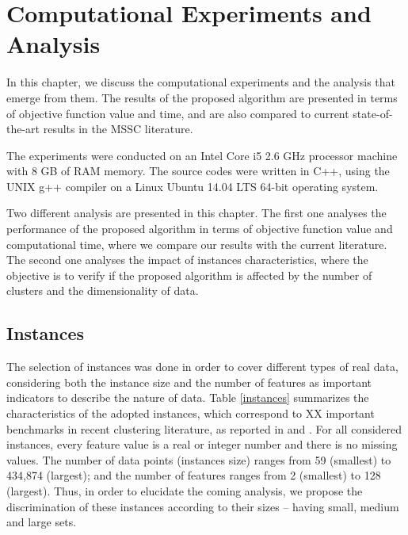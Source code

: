 \chapter{Computational Experiments and Analysis}
In this chapter, we discuss the computational experiments and the analysis that emerge from them. The results of the proposed algorithm are presented in terms of objective function value and time, and are also compared to current state-of-the-art results in the MSSC literature.

The experiments were conducted on an Intel Core i5 2.6 GHz processor machine with 8 GB of RAM memory. The source codes were written in C++, using the UNIX g++ compiler on a Linux Ubuntu 14.04 LTS 64-bit operating system.

Two different analysis are presented in this chapter. The first one analyses the performance of the proposed algorithm in terms of objective function value and computational time, where we compare our results with the current literature. The second one analyses the impact of instances characteristics, where the objective is to verify if the proposed algorithm is affected by the number of clusters and the dimensionality of data.

\section{Instances}
The selection of instances was done in order to cover different types of real data, considering both the instance size and the number of features as important indicators to describe the nature of data. Table \ref{instances} summarizes the characteristics of the adopted instances, which correspond to XX important benchmarks in recent clustering literature, as reported in \cite{Ordin2014} and \cite{Bagirov2016}. For all considered instances, every feature value is a real or integer number and there is no missing values. The number of data points (instances size) ranges from 59 (smallest) to 434,874 (largest); and the number of features ranges from 2 (smallest) to 128 (largest). Thus, in order to elucidate the coming analysis, we propose the discrimination of these instances according to their sizes -- having small, medium and large sets. %



